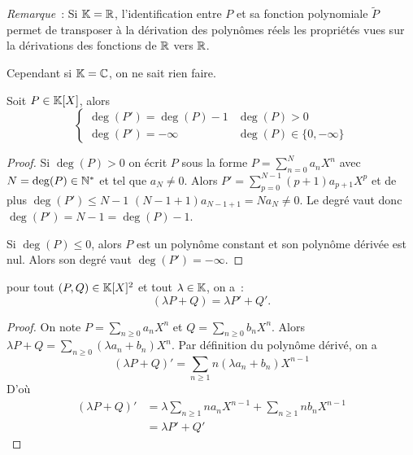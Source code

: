 \emph{Remarque}~: Si \(\mathbb{K} = \mathbb{R}\), l'identification entre \(P\) et sa fonction 
polynomiale \(\widetilde{P}\) permet de transposer à la dérivation des polynômes 
réels les propriétés vues sur la dérivations des fonctions de \(\mathbb{R}\) vers 
\(\mathbb{R}\).

Cependant si \(\mathbb{K} = \mathbb{C}\), on ne sait rien faire.

\begin{prop}
  Soit \(P \in \mathbb{K}[X]\), alors
  \begin{equation}
    \begin{cases}
      \deg(P') = \deg(P)-1 & \deg(P)>0 \\
      \deg(P') = -\infty & \deg(P) \in \{0,-\infty\}
    \end{cases}
  \end{equation}
\end{prop}
\begin{proof}
  Si \(\deg(P)>0\) on écrit \(P\) sous la forme \(P = \sum_{n = 0}^N a_n X^n\) avec 
  \(N = \deg(P) \in \mathbb{N}^*\) et tel que \(a_N \neq 0\). Alors \(P' = \sum_{p = 0}^{N-1} 
  (p+1)a_{p+1} X^{p}\) et de plus \(\deg(P') \leqslant N-1\) 
  \((N-1+1)a_{N-1+1} = Na_N \neq 0\). Le degré vaut donc \(\deg(P') = 
  N-1 = \deg(P)-1\).

  Si \(\deg(P) \leqslant 0\), alors \(P\) est un polynôme constant et son 
  polynôme dérivée est nul. Alors son degré vaut \(\deg(P') = -\infty\).
\end{proof}

\begin{prop}[Linéarité]
  pour tout \((P,Q) \in \mathbb{K}[X]^2\) et tout \(\lambda \in \mathbb{K}\), on a~:
  \begin{equation}
    (\lambda P+Q) = \lambda P'+Q'.
  \end{equation}
\end{prop}
\begin{proof}
  On note \(P = \sum_{n \geqslant 0} a_n X^n\) et \(Q = \sum_{n \geqslant 0} b_n 
  X^n\). Alors \(\lambda P+Q = \sum_{n \geqslant 0} (\lambda a_n+b_n) X^n\). Par 
  définition du polynôme dérivé, on a
  \begin{equation}
    (\lambda P+Q)' = \sum_{n \geqslant 1} n(\lambda a_n+b_n) X^{n-1}
  \end{equation}
  D'où
  \begin{align}
    (\lambda P+Q)' &= \lambda \sum_{n \geqslant 1} n a_n X^{n-1} + \sum_{n 
    \geqslant 1} n b_n X^{n-1}\\
    & = \lambda P' +Q'
  \end{align}
\end{proof}

